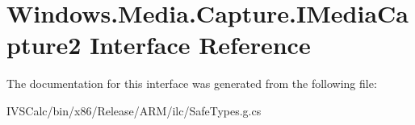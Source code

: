 \hypertarget{interface_windows_1_1_media_1_1_capture_1_1_i_media_capture2}{}\section{Windows.\+Media.\+Capture.\+I\+Media\+Capture2 Interface Reference}
\label{interface_windows_1_1_media_1_1_capture_1_1_i_media_capture2}


The documentation for this interface was generated from the following file\+:\begin{DoxyCompactItemize}
\item 
I\+V\+S\+Calc/bin/x86/\+Release/\+A\+R\+M/ilc/Safe\+Types.\+g.\+cs\end{DoxyCompactItemize}
